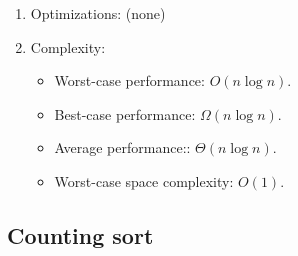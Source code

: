 \documentclass[12pt]{article}
\begin{document}
\begin{enumerate}
        \item Optimizations: (none)
        \item Complexity:
        \begin{itemize}
            \item Worst-case performance: $O(n\log n)$.
            \item Best-case performance: $\Omega(n\log n)$.
            \item Average performance:: $\Theta(n\log n)$.
            \item Worst-case space complexity: $O(1)$.
        \end{itemize}
    \end{enumerate}

    \subsection{Counting sort}
\end{document}
